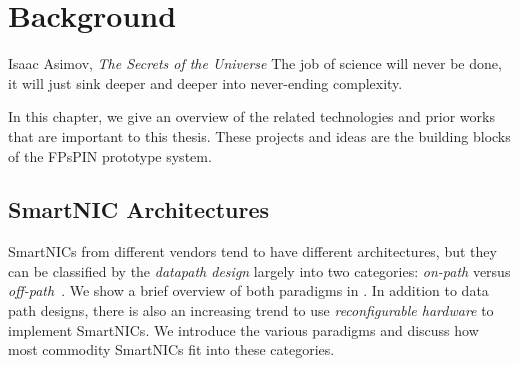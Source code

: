 \chapter{Background}
\begin{chapquote}{Isaac Asimov, \textit{The Secrets of the Universe}}
The job of science will never be done, it will just sink deeper and deeper into never-ending complexity.
\end{chapquote}

In this chapter, we give an overview of the related technologies and prior works that are important to this thesis.  These projects and ideas are the building blocks of the FPsPIN prototype system.

\section{SmartNIC Architectures}
SmartNICs from different vendors tend to have different architectures, but they can be classified by the \emph{datapath design} largely into two categories: \emph{on-path} versus \emph{off-path}~\cite{liu_offloading_2019, wei_characterizing_2023}.  We show a brief overview of both paradigms in .  In addition to data path designs, there is also an increasing trend to use \emph{reconfigurable hardware} to implement SmartNICs.  We introduce the various paradigms and discuss how most commodity SmartNICs fit into these categories.

